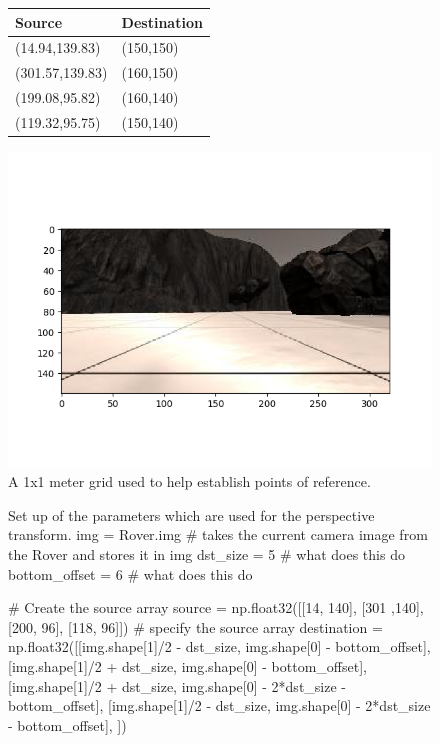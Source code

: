 \documentclass[a4paper]{article}
\begin{document}
\begin{figure}[h]
	\begin{minipage}[m]{0.45\linewidth}
		\centering
		\vspace{0.25cm}
		\begin{tabular}{ll}
		\toprule
		\textbf{Source} & \textbf{Destination}\\
		\midrule
		(14.94,139.83) & (150,150)\\
		(301.57,139.83) & (160,150)\\
		(199.08,95.82) & (160,140)\\
		(119.32,95.75) & (150,140)\\
		\bottomrule
		\end{tabular}
	\end{minipage}
	\hspace{0.5cm}
	\begin{minipage}[m]{0.45\linewidth}
		\centering
		\includegraphics[scale=0.5]{image3}
		\vspace{-1cm}
		\caption{A 1x1 meter grid used to help establish points of reference.}
	\end{minipage}
\end{figure}

\begin{figure}[h]\scriptsize
\begin{sexylisting}{Set up of the parameters which are used for the perspective transform.}
img = Rover.img # takes the current camera image from the Rover and stores it in img
dst_size = 5 # what does this do
bottom_offset = 6 # what does this do
		
# Create the source array 
source = np.float32([[14, 140], [301 ,140],[200, 96], [118, 96]]) # specify the source array
destination = np.float32([[img.shape[1]/2 - dst_size, img.shape[0] - bottom_offset],
	                  [img.shape[1]/2 + dst_size, img.shape[0] - bottom_offset],
			  [img.shape[1]/2 + dst_size, img.shape[0] - 2*dst_size - bottom_offset], 
			  [img.shape[1]/2 - dst_size, img.shape[0] - 2*dst_size - bottom_offset],
			  ])	
\end{sexylisting}
\end{figure}
\end{document}
